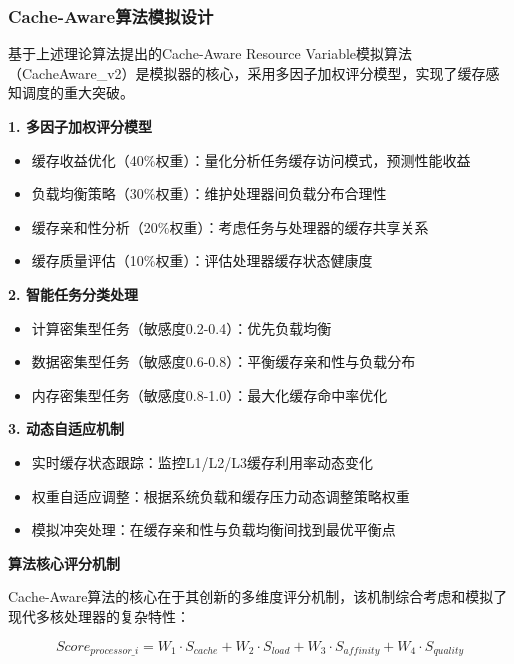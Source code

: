 \subsubsection{Cache-Aware算法模拟设计}

基于上述理论算法提出的Cache-Aware Resource Variable模拟算法（CacheAware\_v2）是模拟器的核心，采用多因子加权评分模型，实现了缓存感知调度的重大突破。

\begin{tcolorbox}[
    colback=green!5!white,
    colframe=green!50!black,
    title=\textbf{Cache-Aware算法核心创新点},
    fonttitle=\bfseries,
    arc=3pt
]
\textbf{1. 多因子加权评分模型}
\begin{itemize}
    \item 缓存收益优化（40\%权重）：量化分析任务缓存访问模式，预测性能收益
    \item 负载均衡策略（30\%权重）：维护处理器间负载分布合理性
    \item 缓存亲和性分析（20\%权重）：考虑任务与处理器的缓存共享关系
    \item 缓存质量评估（10\%权重）：评估处理器缓存状态健康度
\end{itemize}

\textbf{2. 智能任务分类处理}
\begin{itemize}
    \item 计算密集型任务（敏感度0.2-0.4）：优先负载均衡
    \item 数据密集型任务（敏感度0.6-0.8）：平衡缓存亲和性与负载分布
    \item 内存密集型任务（敏感度0.8-1.0）：最大化缓存命中率优化
\end{itemize}

\textbf{3. 动态自适应机制}
\begin{itemize}
    \item 实时缓存状态跟踪：监控L1/L2/L3缓存利用率动态变化
    \item 权重自适应调整：根据系统负载和缓存压力动态调整策略权重
    \item 模拟冲突处理：在缓存亲和性与负载均衡间找到最优平衡点
\end{itemize}
\end{tcolorbox}

\textbf{算法核心评分机制}

Cache-Aware算法的核心在于其创新的多维度评分机制，该机制综合考虑和模拟了现代多核处理器的复杂特性：

\begin{equation}
Score_{processor\_i} = W_1 \cdot S_{cache} + W_2 \cdot S_{load} + W_3 \cdot S_{affinity} + W_4 \cdot S_{quality}
\end{equation}


